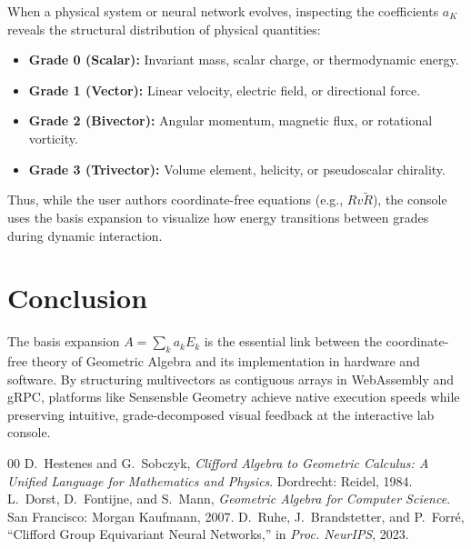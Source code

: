 \documentclass[conference]{IEEEtran}
\begin{document}
When a physical system or neural network evolves, inspecting the coefficients $a_K$ reveals the structural distribution of physical quantities:
\begin{itemize}
    \item \textbf{Grade 0 (Scalar):} Invariant mass, scalar charge, or thermodynamic energy.
    \item \textbf{Grade 1 (Vector):} Linear velocity, electric field, or directional force.
    \item \textbf{Grade 2 (Bivector):} Angular momentum, magnetic flux, or rotational vorticity.
    \item \textbf{Grade 3 (Trivector):} Volume element, helicity, or pseudoscalar chirality.
\end{itemize}

Thus, while the user authors coordinate-free equations (e.g., $R v \tilde{R}$), the console uses the basis expansion to visualize how energy transitions between grades during dynamic interaction.

\section{Conclusion}

The basis expansion $A = \sum_k a_k E_k$ is the essential link between the coordinate-free theory of Geometric Algebra and its implementation in hardware and software. By structuring multivectors as contiguous arrays in WebAssembly and gRPC, platforms like Sensensble Geometry achieve native execution speeds while preserving intuitive, grade-decomposed visual feedback at the interactive lab console.

\begin{thebibliography}{00}
 D.~Hestenes and G.~Sobczyk, \emph{Clifford Algebra to Geometric Calculus: A Unified Language for Mathematics and Physics}. Dordrecht: Reidel, 1984.
 L.~Dorst, D.~Fontijne, and S.~Mann, \emph{Geometric Algebra for Computer Science}. San Francisco: Morgan Kaufmann, 2007.
 D.~Ruhe, J.~Brandstetter, and P.~Forr\'{e}, ``Clifford Group Equivariant Neural Networks,'' in \emph{Proc. NeurIPS}, 2023.
\end{thebibliography}
\end{document}
